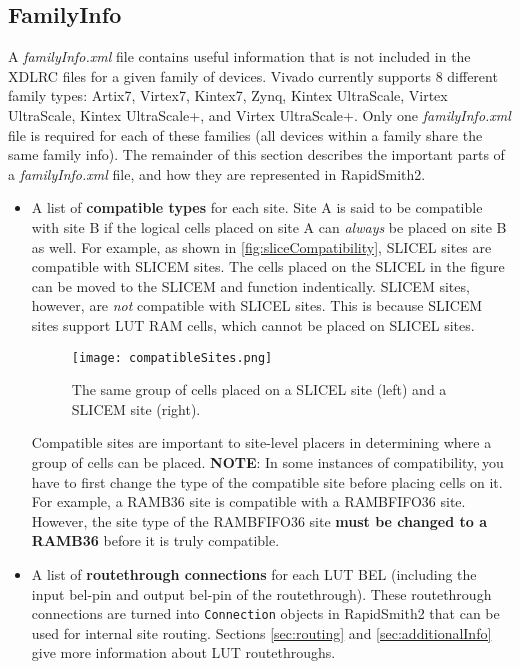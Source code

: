 \subsection{FamilyInfo}
A \textit{familyInfo.xml} file contains useful information that is
not included in the XDLRC files for a given family of devices. Vivado currently 
supports 8 different family types: Artix7, Virtex7, Kintex7, Zynq, Kintex
UltraScale, Virtex UltraScale, Kintex UltraScale+, and Virtex UltraScale+. Only
one \textit{familyInfo.xml} file is required for each of these families (all 
devices within a family share the same family info). The remainder of this
section describes the important parts of a \textit{familyInfo.xml} file, and how
they are represented in RapidSmith2.

\begin{itemize}
  \item A list of \textbf{compatible types} for each site. Site A is said to be
  compatible with site B if the logical cells placed on site A can
  \textit{always} be placed on site B as well. For example, as shown in
  \autoref{fig:sliceCompatibility}, SLICEL sites are compatible with SLICEM
  sites. The cells placed on the SLICEL in the figure can be moved to the
  SLICEM and function indentically. SLICEM sites, however, are \textit{not}
  compatible with SLICEL sites. This is because SLICEM sites support LUT RAM
  cells, which cannot be placed on SLICEL sites.
  
  \begin{figure}[H]
    \centering
    \texttt{[image: compatibleSites.png]}
    \caption{The same group of cells placed on a SLICEL site (left) and a SLICEM
    site (right).}
    \label{fig:sliceCompatibility}
  \end{figure}
  
  \noindent Compatible sites are important
  to site-level placers in determining where a group of cells can be placed.
  \textbf{NOTE}: In some instances of compatibility, you have to first change
  the type of the compatible site before placing cells on it. For example, a
  RAMB36 site is compatible with a RAMBFIFO36 site. However, the site type of
  the RAMBFIFO36 site \textbf{must be changed to a RAMB36} before it is
  truly compatible.
  
  \item A list of \textbf{routethrough connections} for each LUT BEL (including
  the input bel-pin and output bel-pin of the routethrough). These routethrough
  connections are turned into \texttt{Connection} objects in RapidSmith2 that
  can be used for internal site routing. Sections \ref{sec:routing} and
  \ref{sec:additionalInfo} give more information about LUT routethroughs.
  

\end{itemize}
